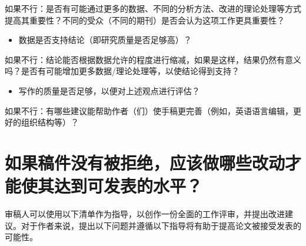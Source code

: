 如果不行：是否有可能通过更多的数据、不同的分析方法、改进的理论处理等方式提高其重要性？不同的受众（不同的期刊）是否会认为这项工作更具重要性？

\begin{itemize}
\item 数据是否支持结论（即研究质量是否足够高）？
\end{itemize}

如果不行：结论能否根据数据允许的程度进行缩减，如果是这样，结果仍然有意义吗？是否有可能增加更多数据/理论处理等，以使结论得到支持？

\begin{itemize}
\item 写作的质量是否足够，以便对上述观点进行评估？
\end{itemize}

如果不行：有哪些建议能帮助作者（们）使手稿更完善（例如，英语语言编辑，更好的组织结构等）？

\section*{如果稿件没有被拒绝，应该做哪些改动才能使其达到可发表的水平？}
审稿人可以使用以下清单作为指导，以创作一份全面的工作评审，并提出改进建议。对于作者来说，提出以下问题并遵循以下指导将有助于提高论文被接受发表的可能性。

